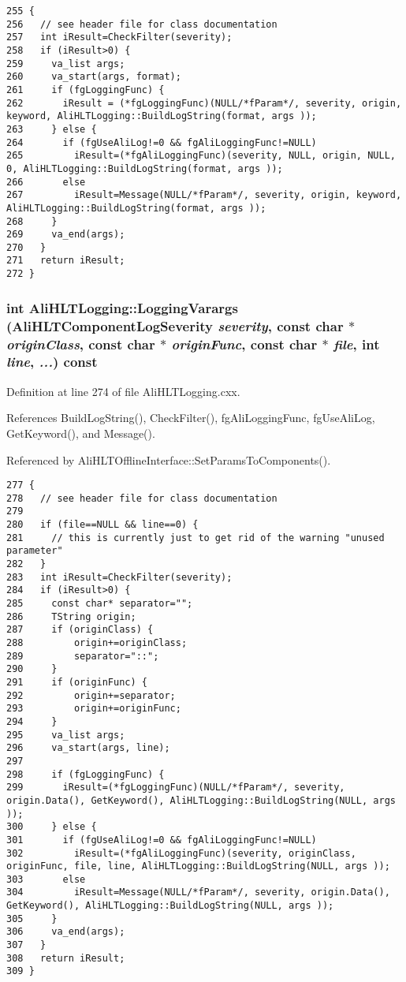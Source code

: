 \footnotesize\begin{verbatim}255 {
256   // see header file for class documentation
257   int iResult=CheckFilter(severity);
258   if (iResult>0) {
259     va_list args;
260     va_start(args, format);
261     if (fgLoggingFunc) {
262       iResult = (*fgLoggingFunc)(NULL/*fParam*/, severity, origin, keyword, AliHLTLogging::BuildLogString(format, args ));
263     } else {
264       if (fgUseAliLog!=0 && fgAliLoggingFunc!=NULL)
265         iResult=(*fgAliLoggingFunc)(severity, NULL, origin, NULL, 0, AliHLTLogging::BuildLogString(format, args ));
266       else
267         iResult=Message(NULL/*fParam*/, severity, origin, keyword, AliHLTLogging::BuildLogString(format, args ));
268     }
269     va_end(args);
270   }
271   return iResult;
272 }
\end{verbatim}\normalsize 


\subsubsection{\setlength{\rightskip}{0pt plus 5cm}int Ali\-HLTLogging::Logging\-Varargs ({\bf Ali\-HLTComponent\-Log\-Severity} {\em severity}, const char $\ast$ {\em origin\-Class}, const char $\ast$ {\em origin\-Func}, const char $\ast$ {\em file}, int {\em line},  {\em ...}) const}\label{classAliHLTLogging_a8}




Definition at line 274 of file Ali\-HLTLogging.cxx.

References Build\-Log\-String(), Check\-Filter(), fg\-Ali\-Logging\-Func, fg\-Use\-Ali\-Log, Get\-Keyword(), and Message().

Referenced by Ali\-HLTOffline\-Interface::Set\-Params\-To\-Components().

\footnotesize\begin{verbatim}277 {
278   // see header file for class documentation
279 
280   if (file==NULL && line==0) {
281     // this is currently just to get rid of the warning "unused parameter"
282   }
283   int iResult=CheckFilter(severity);
284   if (iResult>0) {
285     const char* separator="";
286     TString origin;
287     if (originClass) {
288         origin+=originClass;
289         separator="::";
290     }
291     if (originFunc) {
292         origin+=separator;
293         origin+=originFunc;
294     }
295     va_list args;
296     va_start(args, line);
297 
298     if (fgLoggingFunc) {
299       iResult=(*fgLoggingFunc)(NULL/*fParam*/, severity, origin.Data(), GetKeyword(), AliHLTLogging::BuildLogString(NULL, args ));
300     } else {
301       if (fgUseAliLog!=0 && fgAliLoggingFunc!=NULL)
302         iResult=(*fgAliLoggingFunc)(severity, originClass, originFunc, file, line, AliHLTLogging::BuildLogString(NULL, args ));
303       else
304         iResult=Message(NULL/*fParam*/, severity, origin.Data(), GetKeyword(), AliHLTLogging::BuildLogString(NULL, args ));
305     }
306     va_end(args);
307   }
308   return iResult;
309 }
\end{verbatim}\normalsize 


